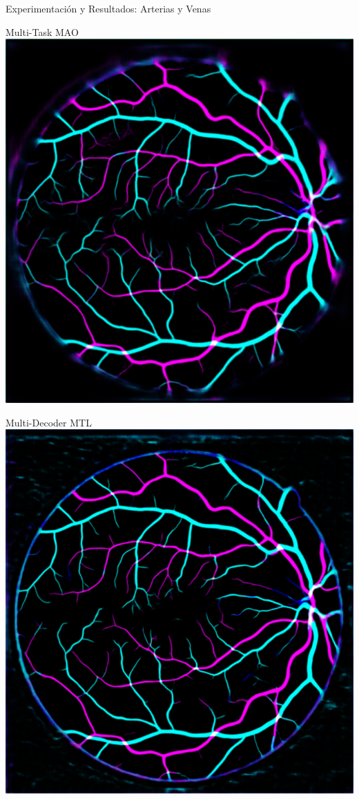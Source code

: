 \documentclass[xcolor=dvipsnames,table]{beamer}
\begin{document}
\begin{frame}{Experimentación y Resultados: Arterias y Venas}
\begin{minipage}[b]{0.13\textwidth}
	\end{minipage}\hfill
	\begin{minipage}[b]{0.13\textwidth}
		\centering
		Multi-Task MAO\\[0.2cm]
		\includegraphics[width=\linewidth]{my_images/video/AVTASKMAO.png}
	\end{minipage}\hfill
	\begin{minipage}[b]{0.13\textwidth}
		\centering
		Multi-Decoder MTL\\[0.2cm]
		\includegraphics[width=\linewidth]{my_images/video/AVMULTIMTL.png}

\end{minipage}
\end{frame}
\end{document}
